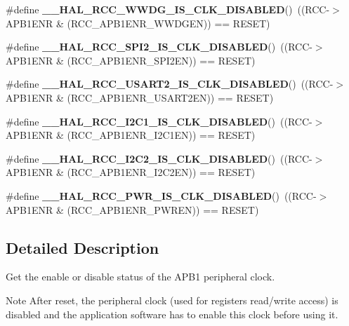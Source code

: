 \begin{DoxyCompactItemize}
\#define {\bfseries \+\_\+\+\_\+\+H\+A\+L\+\_\+\+R\+C\+C\+\_\+\+W\+W\+D\+G\+\_\+\+I\+S\+\_\+\+C\+L\+K\+\_\+\+D\+I\+S\+A\+B\+L\+ED}()~((R\+CC-\/$>$A\+P\+B1\+E\+NR \& (R\+C\+C\+\_\+\+A\+P\+B1\+E\+N\+R\+\_\+\+W\+W\+D\+G\+EN)) == R\+E\+S\+ET)
\item 
\mbox{\label{group___r_c_c___a_p_b1___peripheral___clock___enable___disable___status_gaab213cf8807d6e7e8b3867ffb404d763}} 
\#define {\bfseries \+\_\+\+\_\+\+H\+A\+L\+\_\+\+R\+C\+C\+\_\+\+S\+P\+I2\+\_\+\+I\+S\+\_\+\+C\+L\+K\+\_\+\+D\+I\+S\+A\+B\+L\+ED}()~((R\+CC-\/$>$A\+P\+B1\+E\+NR \& (R\+C\+C\+\_\+\+A\+P\+B1\+E\+N\+R\+\_\+\+S\+P\+I2\+EN)) == R\+E\+S\+ET)
\item 
\mbox{\label{group___r_c_c___a_p_b1___peripheral___clock___enable___disable___status_ga61e4b1f3e82831cdc7508d4c38312eab}} 
\#define {\bfseries \+\_\+\+\_\+\+H\+A\+L\+\_\+\+R\+C\+C\+\_\+\+U\+S\+A\+R\+T2\+\_\+\+I\+S\+\_\+\+C\+L\+K\+\_\+\+D\+I\+S\+A\+B\+L\+ED}()~((R\+CC-\/$>$A\+P\+B1\+E\+NR \& (R\+C\+C\+\_\+\+A\+P\+B1\+E\+N\+R\+\_\+\+U\+S\+A\+R\+T2\+EN)) == R\+E\+S\+ET)
\item 
\mbox{\label{group___r_c_c___a_p_b1___peripheral___clock___enable___disable___status_ga8868ab331b4bb14a1d5cc55c9133e4de}} 
\#define {\bfseries \+\_\+\+\_\+\+H\+A\+L\+\_\+\+R\+C\+C\+\_\+\+I2\+C1\+\_\+\+I\+S\+\_\+\+C\+L\+K\+\_\+\+D\+I\+S\+A\+B\+L\+ED}()~((R\+CC-\/$>$A\+P\+B1\+E\+NR \& (R\+C\+C\+\_\+\+A\+P\+B1\+E\+N\+R\+\_\+\+I2\+C1\+EN)) == R\+E\+S\+ET)
\item 
\mbox{\label{group___r_c_c___a_p_b1___peripheral___clock___enable___disable___status_gae051ecb26de5c5b44f1827923c9837a5}} 
\#define {\bfseries \+\_\+\+\_\+\+H\+A\+L\+\_\+\+R\+C\+C\+\_\+\+I2\+C2\+\_\+\+I\+S\+\_\+\+C\+L\+K\+\_\+\+D\+I\+S\+A\+B\+L\+ED}()~((R\+CC-\/$>$A\+P\+B1\+E\+NR \& (R\+C\+C\+\_\+\+A\+P\+B1\+E\+N\+R\+\_\+\+I2\+C2\+EN)) == R\+E\+S\+ET)
\item 
\mbox{\label{group___r_c_c___a_p_b1___peripheral___clock___enable___disable___status_ga1019fdeb30eb4bcb23a0bea2278a94a2}} 
\#define {\bfseries \+\_\+\+\_\+\+H\+A\+L\+\_\+\+R\+C\+C\+\_\+\+P\+W\+R\+\_\+\+I\+S\+\_\+\+C\+L\+K\+\_\+\+D\+I\+S\+A\+B\+L\+ED}()~((R\+CC-\/$>$A\+P\+B1\+E\+NR \& (R\+C\+C\+\_\+\+A\+P\+B1\+E\+N\+R\+\_\+\+P\+W\+R\+EN)) == R\+E\+S\+ET)
\end{DoxyCompactItemize}


\subsection{Detailed Description}
Get the enable or disable status of the A\+P\+B1 peripheral clock. 

\begin{DoxyNote}{Note}
After reset, the peripheral clock (used for registers read/write access) is disabled and the application software has to enable this clock before using it. 
\end{DoxyNote}
